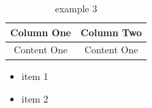 \documentclass[UTF-8]{article}
\begin{document}
\begin{table}
    \centering
    \begin{tabular}{|c|c|}\hline
        Column One & Column Two \\ \hline
        Content One & Content One\\ \hline
    \end{tabular}
    \caption{example 3}
    \label{example 3}
\end{table}

\begin{itemize}
    \item item 1
    \item item 2
\end{itemize}




\end{document}
